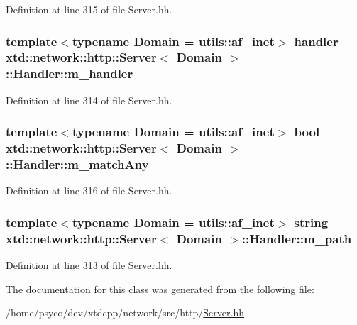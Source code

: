Definition at line 315 of file Server.\+hh.

\subsubsection[{\texorpdfstring{m\+\_\+handler}{m_handler}}]{\setlength{\rightskip}{0pt plus 5cm}template$<$typename Domain  = utils\+::af\+\_\+inet$>$ {\bf handler} {\bf xtd\+::network\+::http\+::\+Server}$<$ Domain $>$\+::Handler\+::m\+\_\+handler}\hypertarget{classxtd_1_1network_1_1http_1_1Server_1_1Handler_a4dfed2def9b251595d4ee176c106882f}{}\label{classxtd_1_1network_1_1http_1_1Server_1_1Handler_a4dfed2def9b251595d4ee176c106882f}


Definition at line 314 of file Server.\+hh.

\subsubsection[{\texorpdfstring{m\+\_\+match\+Any}{m_matchAny}}]{\setlength{\rightskip}{0pt plus 5cm}template$<$typename Domain  = utils\+::af\+\_\+inet$>$ bool {\bf xtd\+::network\+::http\+::\+Server}$<$ Domain $>$\+::Handler\+::m\+\_\+match\+Any}\hypertarget{classxtd_1_1network_1_1http_1_1Server_1_1Handler_a7605921b1ffffb66376920cfa6ebcb08}{}\label{classxtd_1_1network_1_1http_1_1Server_1_1Handler_a7605921b1ffffb66376920cfa6ebcb08}


Definition at line 316 of file Server.\+hh.

\subsubsection[{\texorpdfstring{m\+\_\+path}{m_path}}]{\setlength{\rightskip}{0pt plus 5cm}template$<$typename Domain  = utils\+::af\+\_\+inet$>$ string {\bf xtd\+::network\+::http\+::\+Server}$<$ Domain $>$\+::Handler\+::m\+\_\+path}\hypertarget{classxtd_1_1network_1_1http_1_1Server_1_1Handler_aaea3487ea9687e61c40453d90841b223}{}\label{classxtd_1_1network_1_1http_1_1Server_1_1Handler_aaea3487ea9687e61c40453d90841b223}


Definition at line 313 of file Server.\+hh.



The documentation for this class was generated from the following file\+:\begin{DoxyCompactItemize}
\item 
/home/psyco/dev/xtdcpp/network/src/http/\hyperlink{http_2Server_8hh}{Server.\+hh}\end{DoxyCompactItemize}
